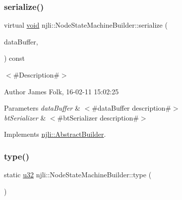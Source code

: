 \subsubsection{\texorpdfstring{serialize()}{serialize()}}
{\footnotesize\ttfamily virtual \mbox{\hyperlink{_thread_8h_af1e856da2e658414cb2456cb6f7ebc66}{void}} njli\+::\+Node\+State\+Machine\+Builder\+::serialize (\begin{DoxyParamCaption}\item[{\mbox{\hyperlink{_thread_8h_af1e856da2e658414cb2456cb6f7ebc66}{void}} $\ast$}]{data\+Buffer,  }\item[{bt\+Serializer $\ast$}]{ }\end{DoxyParamCaption}) const\hspace{0.3cm}{\ttfamily [virtual]}}



$<$\#\+Description\#$>$ 

\begin{DoxyAuthor}{Author}
James Folk, 16-\/02-\/11 15\+:02\+:25
\end{DoxyAuthor}

\begin{DoxyParams}{Parameters}
{\em data\+Buffer} & $<$\#data\+Buffer description\#$>$ \\
\hline
{\em bt\+Serializer} & $<$\#bt\+Serializer description\#$>$ \\
\hline
\end{DoxyParams}


Implements \mbox{\hyperlink{classnjli_1_1_abstract_builder_ab66b774e02ccb9da554c9aab7fa6d981}{njli\+::\+Abstract\+Builder}}.

\mbox{\label{classnjli_1_1_node_state_machine_builder_a167eb52c0f2a1816f9afaf9544e5f2da}} 
\subsubsection{\texorpdfstring{type()}{type()}}
{\footnotesize\ttfamily static \mbox{\hyperlink{_util_8h_a10e94b422ef0c20dcdec20d31a1f5049}{u32}} njli\+::\+Node\+State\+Machine\+Builder\+::type (\begin{DoxyParamCaption}{ }\end{DoxyParamCaption})\hspace{0.3cm}{\ttfamily [static]}}

